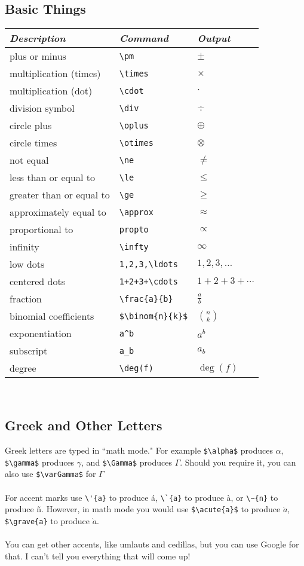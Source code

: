 \documentclass[12pt]{article}
\theoremstyle{definition}
\begin{document}
\subsection{Basic Things}%
\begin{tabular}{| l | l | l |} \hline
\textit{Description} & \textit{Command} & \textit{Output}\\ \hline
plus or minus & \verb!\pm! & $\pm$\\ \hline
multiplication (times) & \verb!\times! & $\times$\\ \hline
multiplication (dot) & \verb!\cdot! & $\cdot$\\ \hline
division symbol & \verb!\div! & $\div$\\ \hline
circle plus & \verb!\oplus! & $\oplus$\\ \hline
circle times & \verb!\otimes! & $\otimes$\\ \hline
not equal & \verb!\ne! & $\ne$\\ \hline
less than or equal to & \verb!\le! & $\le$\\ \hline
greater than or equal to & \verb!\ge! & $\ge$\\ \hline
approximately equal to & \verb!\approx! & $\approx$\\ \hline
proportional to  & \verb+propto+ &$\propto$\\ \hline
infinity & \verb!\infty! & $\infty$\\ \hline
low dots & \verb!1,2,3,\ldots! & $1,2,3,\ldots$\\ \hline
centered dots & \verb!1+2+3+\cdots! & $1+2+3+\cdots$\\ \hline
fraction & \verb!\frac{a}{b}! & $\frac{a}{b}$\\ \hline
binomial coefficients & \verb!$\binom{n}{k}$! & $\binom{n}{k}$ \\ \hline
exponentiation & \verb!a^b! & $a^{b}$\\ \hline
subscript & \verb!a_b! & $a_{b}$\\ \hline
degree & \verb!\deg(f)! & $\deg(f)$\\ \hline
\end{tabular}
\\
\subsection{Greek and Other Letters}
Greek letters are typed in ``math mode."  For example \verb!$\alpha$! produces $\alpha$, \verb!$\gamma$! produces $\gamma$, and \verb!$\Gamma$! produces $\Gamma$.  Should you require it, you can also use \verb!$\varGamma$! for $\varGamma$
\\ \\
For accent marks use \verb!\'{a}! to produce \'{a}, \verb!\`{a}! to produce \`{a}, or \verb!\~{n}! to produce \~{n}.  However, in math mode you would use \verb!$\acute{a}$! to produce $\acute{a}$, \verb!$\grave{a}! to produce $\grave{a}$.
\\ \\
You can get other accents, like umlauts and cedillas, but you can use Google for that.  I can't tell you everything that will come up!
\end{document}
